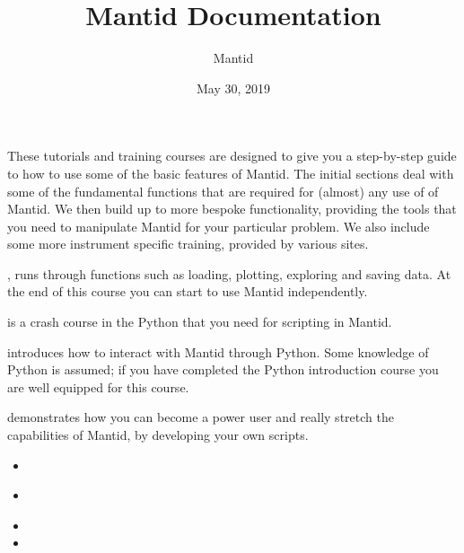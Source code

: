 \documentclass[letterpaper,10pt,english,openany]{sphinxmanual}
\title{Mantid Documentation}
\date{May 30, 2019}
\author{Mantid}
\let\sphinxpxdimen\pdfpxdimen\else\newdimen\sphinxpxdimen
\begin{document}
\pagestyle{empty}
\sphinxmaketitle
\pagestyle{plain}
\sphinxtableofcontents
\pagestyle{normal}
\label{\detokenize{index::doc}}


These tutorials and training courses are designed to give you a step-by-step guide to how to use some of the basic features of Mantid.
The initial sections deal with some of the fundamental functions that are required for (almost) any use of of Mantid. We then build
up to more bespoke functionality, providing the tools that you need to manipulate Mantid for your particular problem. We also
include some more instrument specific training, provided by various sites.

, runs through functions such as loading, plotting, exploring and saving data.
At the end of this course you can start to use Mantid independently.

 is a crash course in the Python that you need for scripting in Mantid.

 introduces how to interact with Mantid through Python. Some knowledge of
Python is assumed; if you have completed the Python introduction course you are well equipped
for this course.

 demonstrates how you can become a power user and really stretch the
capabilities of Mantid, by developing your own scripts.


\noindent{\hspace*{\fill}\sphinxincludegraphics[width=200\sphinxpxdimen]{{mantid}.png}}
\begin{itemize}
\item {} 
{\hyperref[\detokenize{mantid_basic_course/index:mantid-basic-course}]{}}

\item {} 
{\hyperref[\detokenize{introduction_to_python/index:introduction-to-python}]{}}

\item {} 

\item {} 

\end{itemize}
\end{document}
